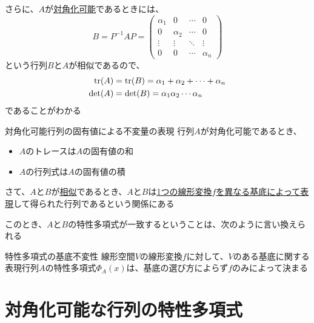 \documentclass[../../../topic_linear-algebra]{subfiles}
\begin{document}
\br

さらに、$A$が\hyperref[def:diagonalizable]{対角化可能}であるときには、
\begin{equation*}
  B = P^{-1}AP = \begin{pmatrix}
    \alpha_1 & 0        & \cdots & 0        \\
    0        & \alpha_2 & \cdots & 0        \\
    \vdots   & \vdots   & \ddots & \vdots   \\
    0        & 0        & \cdots & \alpha_n
  \end{pmatrix}
\end{equation*}
という行列$B$と$A$が相似であるので、
\begin{align*}
  \tr(A)  & = \tr(B) = \alpha_1 + \alpha_2 + \cdots + \alpha_n \\
  \det(A) & = \det(B) = \alpha_1 \alpha_2 \cdots \alpha_n
\end{align*}
であることがわかる

\begin{theorem*}{対角化可能行列の固有値による不変量の表現}
  行列$A$が対角化可能であるとき、
  \begin{itemize}
    \item $A$のトレースは$A$の固有値の和
    \item $A$の行列式は$A$の固有値の積
  \end{itemize}
\end{theorem*}

\sectionline

さて、$A$と$B$が\hyperref[def:similar-matrices]{相似}であるとき、$A$と$B$は\hyperref[thm:similarity-under-basis-change]{1つの線形変換$f$を異なる基底によって表現}して得られた行列であるという関係にある

\br

このとき、$A$と$B$の特性多項式が一致するということは、次のように言い換えられる

\begin{theorem*}{特性多項式の基底不変性}
  線形空間$V$の線形変換$f$に対して、$V$のある基底に関する表現行列$A$の特性多項式$\Phi_A(x)$は、基底の選び方によらず$f$のみによって決まる
\end{theorem*}

\sectionline
\section{対角化可能な行列の特性多項式}
\end{document}
